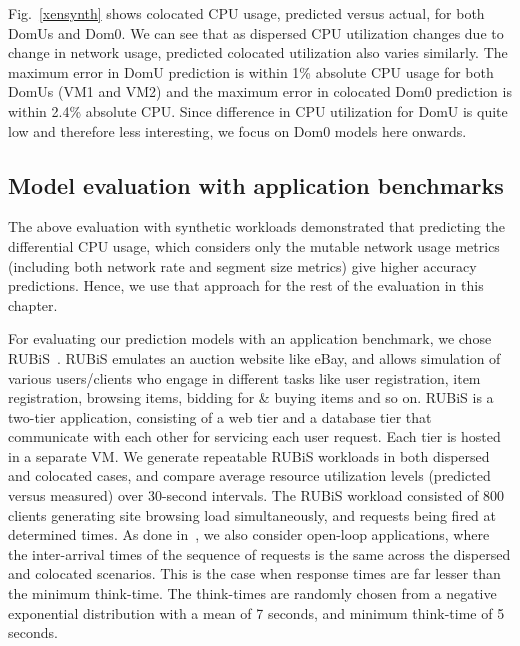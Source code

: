 Fig.~\ref{xensynth} shows colocated
CPU usage, predicted versus actual, for both DomUs and Dom0.
We can see that as dispersed CPU utilization
changes due to change in network usage, predicted colocated
utilization also varies similarly.
The maximum error in DomU prediction is within 1\% absolute
CPU usage for both DomUs (VM1 and VM2) and the maximum
error in colocated Dom0 prediction is within 2.4\% absolute CPU.
Since difference in CPU utilization for DomU is
quite low and therefore less interesting, we focus on Dom0
models here onwards.


\subsection{Model evaluation with application benchmarks}
The above evaluation with synthetic workloads demonstrated
that predicting the differential CPU usage, which considers
only the mutable network usage metrics (including both network rate
and segment size metrics) give higher accuracy predictions.
Hence, we use that approach for the rest of the evaluation
in this chapter.




For evaluating our prediction models with an application benchmark, we 
chose RUBiS~\cite{rubis}.
RUBiS emulates an auction 
website like eBay, and allows simulation of various users/clients who engage
in different tasks like user registration, item registration, browsing items,
bidding for \& buying items and so on. 
RUBiS is a two-tier application, consisting of a web tier and a database tier
that communicate with each other for servicing each user request. Each tier
is hosted in a separate VM. 
We generate repeatable RUBiS workloads in both dispersed and colocated cases,
and compare average resource utilization levels (predicted versus measured)
over 30-second intervals. The RUBiS workload consisted of 800 clients
generating site browsing load simultaneously, and requests being fired
at determined times.
As done in~\cite{profiling-and-modeling}, we also consider open-loop
applications, where the inter-arrival times of the sequence of requests 
is the same across the dispersed and colocated scenarios. 
This is the case when response times are far lesser than the minimum
think-time. The think-times are randomly chosen from a negative 
exponential distribution with a mean of 7 seconds, and minimum think-time
of 5 seconds.

